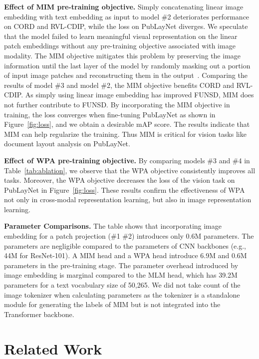 \documentclass[sigconf]{acmart}
\begin{document}
\noindent \textbf{Effect of MIM pre-training objective.}
Simply concatenating linear image embedding with text embedding as input to model \#2 deteriorates performance on CORD and RVL-CDIP, while the loss on PubLayNet diverges.
We speculate that the model failed to learn meaningful visual representation on the linear patch embeddings without any pre-training objective associated with image modality.
The MIM objective mitigates this problem by preserving the image information until the last layer of the model by randomly masking out a portion of input image patches and reconstructing them in the output~\cite{kim2021vilt}.
Comparing the results of model \#3 and model \#2, the MIM objective benefits CORD and RVL-CDIP.
As simply using linear image embedding has improved FUNSD, MIM does not further contribute to FUNSD.
By incorporating the MIM objective in training, the loss converges when fine-tuning PubLayNet as shown in Figure~\ref{fig:loss}, and we obtain a desirable mAP score.
The results indicate that MIM can help regularize the training. Thus MIM is critical for vision tasks like document layout analysis on PubLayNet.


\noindent \textbf{Effect of WPA pre-training objective.}
By comparing models \#3 and \#4 in Table~\ref{tab:ablation}, we observe that the WPA objective consistently improves all tasks.
Moreover, the WPA objective decreases the loss of the vision task on PubLayNet in Figure~\ref{fig:loss}.
These results confirm the effectiveness of WPA not only in cross-modal representation learning, but also in image representation learning.

\noindent \textbf{Parameter Comparisons.}
The table shows that incorporating image embedding for a  patch projection (\#1  \#2) introduces only 0.6M parameters.
The parameters are negligible compared to the parameters of CNN backbones (e.g., 44M for ResNet-101).
A MIM head and a WPA head introduce 6.9M and 0.6M parameters in the pre-training stage.
The parameter overhead introduced by image embedding is marginal compared to the MLM head,  which has 39.2M parameters for a text vocabulary size of 50,265.
We did not take count of the image tokenizer when calculating parameters as the tokenizer is a standalone module for generating the labels of MIM but is not integrated into the Transformer backbone.


\section{Related Work}
\end{document}
